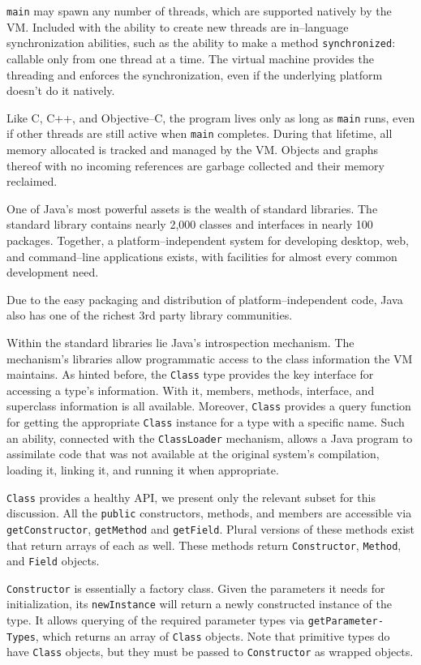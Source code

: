 \texttt{main} may spawn any number of threads, which are supported natively by
the VM. Included with the ability to create new threads are in--language
synchronization abilities, such as the ability to make a method
\texttt{synchronized}: callable only from one thread at a time. The virtual
machine provides the threading and enforces the synchronization, even if the
underlying platform doesn't do it natively.

Like C, C++, and Objective--C, the program lives only as long as \texttt{main}
runs, even if other threads are still active when \texttt{main} completes.
During that lifetime, all memory allocated is tracked and managed by the VM.
Objects and graphs thereof with no incoming references are garbage collected
and their memory reclaimed.

One of Java's most powerful assets is the wealth of standard libraries. The
standard library contains nearly 2,000 classes and interfaces in nearly 100
packages. Together, a platform--independent system for developing desktop,
web, and command--line applications exists, with facilities for almost every
common development need.

Due to the easy packaging and distribution of platform--independent code, Java
also has one of the richest 3rd party library communities.

Within the standard libraries lie Java's introspection mechanism. The
mechanism's libraries allow programmatic access to the class information the
VM maintains. As hinted before, the \texttt{Class} type provides the key
interface for accessing a type's information. With it, members, methods,
interface, and superclass information is all available. Moreover,
\texttt{Class} provides a query function for getting the appropriate
\texttt{Class} instance for a type with a specific name. Such an ability,
connected with the \texttt{ClassLoader} mechanism, allows a Java program to
assimilate code that was not available at the original system's compilation,
loading it, linking it, and running it when appropriate.

\texttt{Class} provides a healthy API, we present only the relevant subset for
this discussion. All the \texttt{public} constructors, methods, and members
are accessible via \texttt{getConstructor}, \texttt{getMethod} and
\texttt{getField}. Plural versions of these methods exist that return arrays
of each as well. These methods return \texttt{Constructor}, \texttt{Method},
and \texttt{Field} objects.

\texttt{Constructor} is essentially a factory class. Given the parameters it
needs for initialization, its \texttt{newInstance} will return a newly
constructed instance of the type. It allows querying of the required parameter
types via \texttt{get\-P\-ar\-am\-et\-er-\-T\-yp\-es}, which returns an array
of \texttt{Class} objects. Note that primitive types do have \texttt{Class}
objects, but they must be passed to \texttt{Constructor} as wrapped objects.

